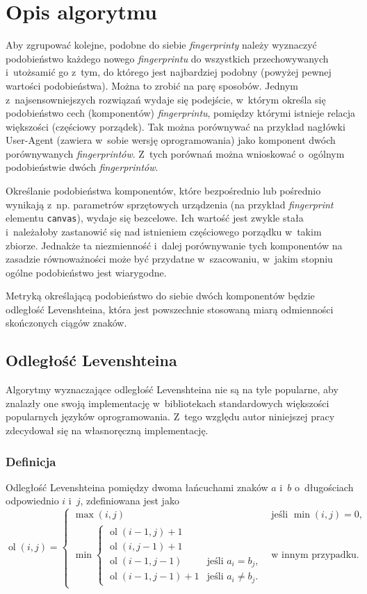 \section{Opis algorytmu}
Aby zgrupować kolejne, podobne do siebie \emph{fingerprinty} należy wyznaczyć
podobieństwo każdego nowego \emph{fingerprintu} do wszystkich przechowywanych
i~utożsamić go z~tym, do którego jest najbardziej podobny (powyżej pewnej
wartości podobieństwa). Można to zrobić na parę sposobów. Jednym
z~najsensowniejszych rozwiązań wydaje się podejście, w~którym określa się
podobieństwo cech (komponentów) \emph{fingerprintu}, pomiędzy którymi istnieje
relacja większości (częściowy porządek). Tak można porównywać na przykład
nagłówki User-Agent (zawiera w~sobie wersję oprogramowania) jako komponent dwóch
porównywanych \emph{fingerprintów}. Z~tych porównań można wnioskować o~ogólnym
podobieństwie dwóch \emph{fingerprintów}.

Określanie podobieństwa komponentów, które bezpośrednio lub pośrednio wynikają
z~np. parametrów sprzętowych urządzenia (na przykład \emph{fingerprint} elementu
\texttt{canvas}), wydaje się bezcelowe. Ich wartość jest zwykle stała
i~należałoby zastanowić się nad istnieniem częściowego porządku w~takim zbiorze.
Jednakże ta niezmienność i~dalej porównywanie tych komponentów na zasadzie
równoważności może być przydatne w~szacowaniu, w~jakim stopniu ogólne
podobieństwo jest wiarygodne.

Metryką określającą podobieństwo do siebie dwóch komponentów będzie odległość
Levenshteina, która jest powszechnie stosowaną miarą odmienności skończonych
ciągów znaków.

\subsection{Odległość Levenshteina}
Algorytmy wyznaczające odległość Levenshteina nie są na tyle popularne, aby
znalazły one swoją implementację w~bibliotekach standardowych większości
popularnych języków oprogramowania. Z~tego względu autor niniejszej pracy
zdecydował się na własnoręczną implementację.

\subsubsection{Definicja}
Odległość Levenshteina pomiędzy dwoma łańcuchami znaków \(a\) i~\(b\)
o~długościach odpowiednio \(i\) i~\(j\), zdefiniowana jest jako
\begin{displaymath}
	\operatorname{ol}(i,j)=
	\begin{cases}
		\max(i,j)                    & \text{jeśli }\min(i,j)=0,  \\
		\min
		\begin{cases}
		\operatorname{ol}(i-1,j)+1 \\
		\operatorname{ol}(i,j-1)+1 \\
		\operatorname{ol}(i-1,j-1)   & \text{jeśli }a_i=b_j,      \\
		\operatorname{ol}(i-1,j-1)+1 & \text{jeśli }a_i \neq b_j. 
	\end{cases} & \text{w innym przypadku}.
	\end{cases}
\end{displaymath}

